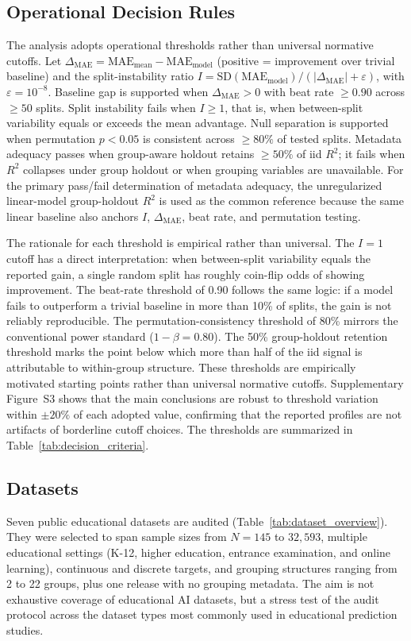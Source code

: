 \documentclass[10pt,letterpaper]{wlscirep}
\begin{document}
\subsection{Operational Decision Rules}
The analysis adopts operational thresholds rather than universal normative cutoffs. Let $\Delta_{\mathrm{MAE}} = \mathrm{MAE}_{\text{mean}} - \mathrm{MAE}_{\text{model}}$ (positive = improvement over trivial baseline) and the split-instability ratio $I = \mathrm{SD}(\mathrm{MAE}_{\text{model}}) / (|\Delta_{\mathrm{MAE}}| + \varepsilon)$, with $\varepsilon = 10^{-8}$. Baseline gap is supported when $\Delta_{\mathrm{MAE}} > 0$ with beat rate $\geq 0.90$ across $\geq 50$ splits. Split instability fails when $I \geq 1$, that is, when between-split variability equals or exceeds the mean advantage. Null separation is supported when permutation $p < 0.05$ is consistent across $\geq 80\%$ of tested splits. Metadata adequacy passes when group-aware holdout retains $\geq 50\%$ of iid $R^2$; it fails when $R^2$ collapses under group holdout or when grouping variables are unavailable. For the primary pass/fail determination of metadata adequacy, the unregularized linear-model group-holdout $R^2$ is used as the common reference because the same linear baseline also anchors $I$, $\Delta_{\mathrm{MAE}}$, beat rate, and permutation testing.

The rationale for each threshold is empirical rather than universal. The $I = 1$ cutoff has a direct interpretation: when between-split variability equals the reported gain, a single random split has roughly coin-flip odds of showing improvement. The beat-rate threshold of 0.90 follows the same logic: if a model fails to outperform a trivial baseline in more than 10\% of splits, the gain is not reliably reproducible. The permutation-consistency threshold of 80\% mirrors the conventional power standard ($1 - \beta = 0.80$). The 50\% group-holdout retention threshold marks the point below which more than half of the iid signal is attributable to within-group structure. These thresholds are empirically motivated starting points rather than universal normative cutoffs. Supplementary Figure~S3 shows that the main conclusions are robust to threshold variation within $\pm 20\%$ of each adopted value, confirming that the reported profiles are not artifacts of borderline cutoff choices. The thresholds are summarized in Table~\ref{tab:decision_criteria}.

\subsection{Datasets}
Seven public educational datasets are audited (Table~\ref{tab:dataset_overview}). They were selected to span sample sizes from $N = 145$ to $32{,}593$, multiple educational settings (K-12, higher education, entrance examination, and online learning), continuous and discrete targets, and grouping structures ranging from 2 to 22 groups, plus one release with no grouping metadata. The aim is not exhaustive coverage of educational AI datasets, but a stress test of the audit protocol across the dataset types most commonly used in educational prediction studies.
\end{document}
